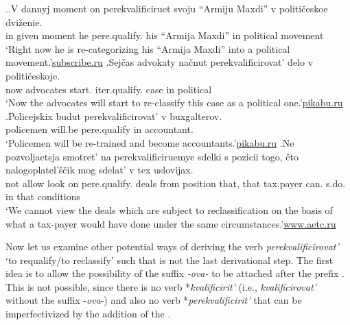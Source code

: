 \ex.\label{ex:qualify}\ag.\label{ex:qualify1}V dannyj moment on perekvalificiruet\textsuperscript{\IPF} svoju {``Armiju Maxdi''} v politi\v{c}eskoe dvi\v{z}enie.\\
in given moment he pere.qualify. his {``Armija Maxdi''} in political movement\\
\trans `Right now he is re-categorizing his ``Armija Maxdi'' into a political movement.'\hbox{}\hfill\hbox{\url{subscribe.ru}}
\bg.\label{ex:qualify2}Sej\v{c}as advokaty na\v{c}nut perekvalificirovat'\textsuperscript{\IPF} delo v politi\v{c}eskoje.\\
now advocates start. iter.qualify. case in political\\
\trans `Now the advocates will start to re-classify this case as a political one.'\hfill\hbox{\url{pikabu.ru}}
\bg.\label{ex:qualify3}Policejskix budut perekvalificirovat'\textsuperscript{\IPF} v buxgalterov.\\	
policemen will.be pere.qualify in accountant.\\
\trans `Policemen will be re-trained and become accountants.'\hbox{}\hfill\hbox{\url{pikabu.ru}}
\bg.\label{ex:qualify4}Ne pozvoljaetsja smotret’ na perekvalificiruemye sdelki s pozicii togo, \v{c}to nalogoplatel’\v{s}\v{c}ik mog sdelat’ v tex uslovijax.\\
not allow look on pere.qualify. deals from position that, that tax.payer can. s.do. in that conditions\\
\trans `We cannot view the deals which are subject to reclassification on the basis of what a tax-payer would have done under the same circum\-stances.'\hbox{}\hfill\hbox{\url{www.aetc.ru}}

Now let us examine other potential ways of deriving the verb \textit{perekvalificirovat'} `to requalify/to reclassify' such that  is not the last derivational step. The first idea is to allow the possibility of the suffix \textit{-ova-} to be attached after the prefix . This is not possible, since there is no verb *\textit{kvalificirit'} (i.e., \textit{kvalificirovat'} without the suffix -\textit{ova}-) and also no verb  *\textit{perekvalificirit'} that can be imperfectivized by the addition of the .

